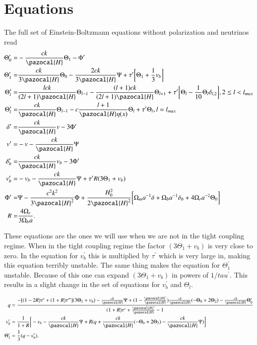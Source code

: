 \documentclass[a4paper]{report}
\begin{document}
\section{Equations}\label{sec:Equations}
The full set of Einstein-Boltzmann equations without polarization and neutrinos read
\begin{align}
 \Theta^\prime_0 =& -\frac{ck}{\pazocal{H}}\Theta_1 - \Phi^\prime\\
 \Theta^\prime_1 =& \frac{ck}{3\pazocal{H}}\Theta_0 - \frac{2ck}{3\pazocal{H}}\Psi + \tau^\prime\bigg[\Theta_1+\frac{1}{3}v_b\bigg]\\
 \Theta_l^\prime =& \frac{lck}{(2l+1)\pazocal{H}}\Theta_{l-1} - \frac{(l+1)ck}{(2l+1)\pazocal{H}}\Theta_{l+1} + \tau^\prime\bigg[\Theta_l-\frac{1}{10}\Theta_l\delta_{l,2} \bigg], 2\le l < l_{max}\\
 \Theta_l^\prime =& \frac{ck}{\pazocal{H}}\Theta_{l-1} - c\frac{l+1}{\pazocal{H}\eta(x)}\Theta_l + \tau^\prime\Theta_l, l=l_{max}\\
 \delta^\prime =&\frac{ck}{\pazocal{H}}v -3\Phi^\prime\\
 v^\prime =& -v -\frac{ck}{\pazocal{H}}\Psi\\
 \delta^\prime_b =& \frac{ck}{\pazocal{H}}v_b - 3\Phi^\prime\\
 v_b^\prime =& -v_b - \frac{ck}{\pazocal{H}}\Psi +\tau^\prime R(3\Theta_1+v_b)\\
 \Phi^\prime =& \Psi - \frac{c^2 k^2}{3\pazocal{H}^2}\Phi + \frac{H_0^2}{2\pazocal{H}^2}\bigg[\Omega_m a^{-1}\delta + \Omega_b a^{-1}\delta_b +4\Omega_r a^{-2}\Theta_0 \bigg]\\
 R =& \frac{4\Omega_r}{3\Omega_b a}.
\end{align}

These equations are the ones we will use when we are not in the tight coupling regime. When in the tight coupling regime the factor $(3\Theta_1+v_b)$ is very close to zero. In the equation for $v_b^\prime$ this is multiplied by $\tau^\prime$ which is very large in, making this equation terribly unstable. The same thing makes the equation for $\Theta^\prime_1$ unstable. Because of this one can expand $(3\Theta_1+v_b)$ in powers of $1/tau^\prime$. This results in 
a slight change in the set of equations for $v_b^\prime$ and $\Theta_l$.

\begin{align} 
q &= \frac{-[(1-2R)\tau^\prime + (1+R)\tau^{\prime\prime}](3\Theta_1+v_b) - \frac{ck}{\pazocal{H}}\Psi + (1-\frac{\pazocal{H}^\prime}{\pazocal{H}})\frac{ck}{\pazocal{H}}(-\Theta_0+2\Theta_2) - \frac{ck}{\pazocal{H}}\Theta_0^\prime} {(1+R)\tau^\prime + \frac{\pazocal{H}^\prime}{\pazocal{H}} - 1}\\
v_b^\prime &= \frac{1}{1+R}\bigg[ -v_b - \frac{ck}{\pazocal{H}}\Psi + R(q + \frac{ck}{\pazocal{H}}(-\Theta_0+2\Theta_2)-\frac{ck}{\pazocal{H}}\Psi) \bigg]\\
\Theta_1^\prime &= \frac{1}{3}(q - v_b^\prime).
 \end{align}
\end{document}
